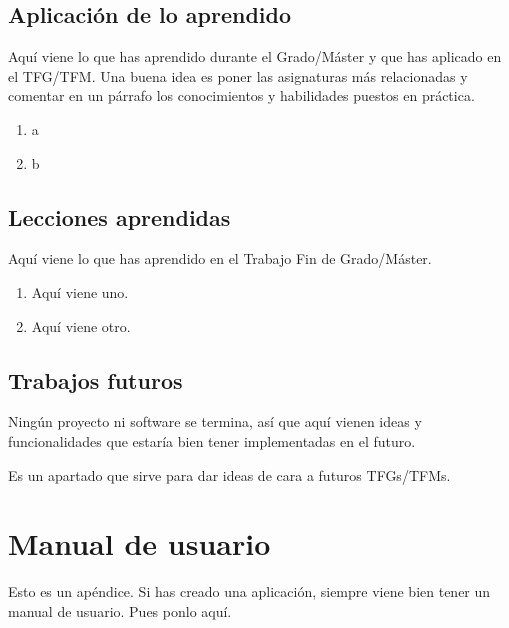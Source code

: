 \documentclass[a4paper, 12pt]{book}
\begin{document}
\section{Aplicación de lo aprendido}
\label{sec:aplicacion}

Aquí viene lo que has aprendido durante el Grado/Máster y que has aplicado en el TFG/TFM.
Una buena idea es poner las asignaturas más relacionadas y comentar en un párrafo los conocimientos y habilidades puestos en práctica.

\begin{enumerate}
  \item a
  \item b
\end{enumerate}


\section{Lecciones aprendidas}
\label{sec:lecciones_aprendidas}

Aquí viene lo que has aprendido en el Trabajo Fin de Grado/Máster.

\begin{enumerate}
  \item Aquí viene uno.
  \item Aquí viene otro.
\end{enumerate}


\section{Trabajos futuros}
\label{sec:trabajos_futuros}

Ningún proyecto ni software se termina, así que aquí vienen ideas y funcionalidades que estaría bien tener implementadas en el futuro.

Es un apartado que sirve para dar ideas de cara a futuros TFGs/TFMs.



\cleardoublepage
\appendix
\chapter{Manual de usuario}
\label{app:manual}

Esto es un apéndice.
Si has creado una aplicación, siempre viene bien tener un manual de usuario.
Pues ponlo aquí.
\end{document}
